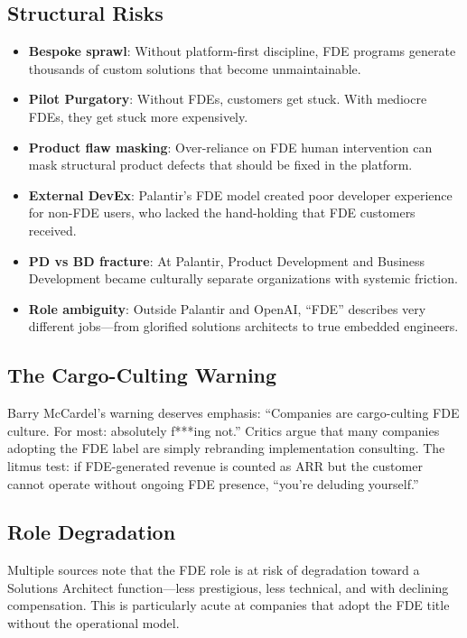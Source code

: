 \subsection{Structural Risks}

\begin{itemize}
    \item \textbf{Bespoke sprawl}: Without platform-first discipline,
        FDE programs generate thousands of custom solutions that become
        unmaintainable.
    \item \textbf{Pilot Purgatory}: Without FDEs, customers get stuck.
        With mediocre FDEs, they get stuck more expensively.
    \item \textbf{Product flaw masking}: Over-reliance on FDE human
        intervention can mask structural product defects that should be
        fixed in the platform.
    \item \textbf{External DevEx}: Palantir's FDE model created poor
        developer experience for non-FDE users, who lacked the
        hand-holding that FDE customers received.
    \item \textbf{PD vs BD fracture}: At Palantir, Product Development
        and Business Development became culturally separate organizations
        with systemic friction.
    \item \textbf{Role ambiguity}: Outside Palantir and OpenAI, ``FDE''
        describes very different jobs---from glorified solutions
        architects to true embedded engineers.
\end{itemize}

\subsection{The Cargo-Culting Warning}

Barry McCardel's warning deserves emphasis: ``Companies are cargo-culting
FDE culture. For most: absolutely f***ing not.'' Critics argue that many
companies adopting the FDE label are simply rebranding implementation
consulting. The litmus test: if FDE-generated revenue is counted as ARR
but the customer cannot operate without ongoing FDE presence, ``you're
deluding yourself.''

\subsection{Role Degradation}

Multiple sources note that the FDE role is at risk of degradation toward
a Solutions Architect function---less prestigious, less technical, and
with declining compensation. This is particularly acute at companies that
adopt the FDE title without the operational model.
